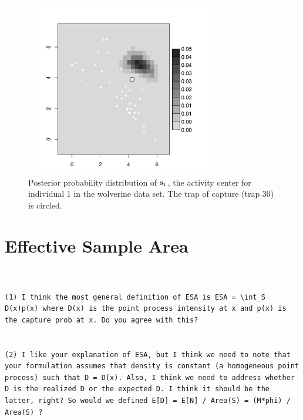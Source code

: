 {\begin{figure}[ht]
\begin{center}
\includegraphics[height=3in,width=3.375in]{Ch4-SCR0/figs/wolv_post_s}
\end{center}
\caption{
Posterior probability distribution of ${\bf s}_{1}$, the activity
center for individual 1 in the wolverine data set. The trap of capture
(trap 30) is circled. 
}
\label{scr0.fig.guy1}
\end{figure}


\section{Effective Sample Area}
\label{scr0.sec.esa}


\begin{verbatim}


(1) I think the most general definition of ESA is ESA = \int_S D(x)p(x) where D(x) is the point process intensity at x and p(x) is the capture prob at x. Do you agree with this?


(2) I like your explanation of ESA, but I think we need to note that your formulation assumes that density is constant (a homogeneous point process) such that D = D(x). Also, I think we need to address whether D is the realized D or the expected D. I think it should be the latter, right? So would we defined E[D] = E[N] / Area(S) = (M*phi) / Area(S) ?

\end{verbatim}


}
